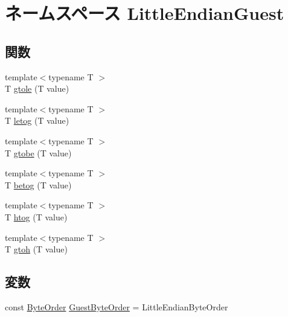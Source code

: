 \hypertarget{namespaceLittleEndianGuest}{
\section{ネームスペース LittleEndianGuest}
\label{namespaceLittleEndianGuest}
}
\subsection*{関数}
\begin{DoxyCompactItemize}
\item 
{\footnotesize template$<$typename T $>$ }\\T \hyperlink{namespaceLittleEndianGuest_aa763802ce48ab3ae2d2f00f36dee207c}{gtole} (T value)
\item 
{\footnotesize template$<$typename T $>$ }\\T \hyperlink{namespaceLittleEndianGuest_a2afbf7328c847d732303dc44c67c425d}{letog} (T value)
\item 
{\footnotesize template$<$typename T $>$ }\\T \hyperlink{namespaceLittleEndianGuest_aea54106b2611ff7926651b34e2b48e50}{gtobe} (T value)
\item 
{\footnotesize template$<$typename T $>$ }\\T \hyperlink{namespaceLittleEndianGuest_ad2b70ae43b0a5f3901a36c4063afb95b}{betog} (T value)
\item 
{\footnotesize template$<$typename T $>$ }\\T \hyperlink{namespaceLittleEndianGuest_a78d5c03420b8ee62e625df90ca9fa66d}{htog} (T value)
\item 
{\footnotesize template$<$typename T $>$ }\\T \hyperlink{namespaceLittleEndianGuest_aa69faf82e7abf95025efbebedcbae1b2}{gtoh} (T value)
\end{DoxyCompactItemize}
\subsection*{変数}
\begin{DoxyCompactItemize}
\item 
const \hyperlink{byteswap_8hh_aaeb92d42f5a6e27b8ba19f18d69d142b}{ByteOrder} \hyperlink{namespaceLittleEndianGuest_aef5e34cb4383d2b11025693e07673656}{GuestByteOrder} = LittleEndianByteOrder
\end{DoxyCompactItemize}


